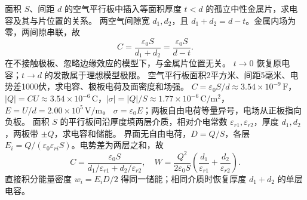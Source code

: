 \problemtext 面积 $S$、间距 $d$ 的空气平行板中插入等面积厚度 $t<d$ 的孤立中性金属片，求电容及其与片位置的关系。
\workings 两空气间隙宽 $d_1,d_2$，且 $d_1+d_2=d-t$。金属内场为零，两间隙串联，故
\[
C=\frac{\varepsilon_0 S}{d_1+d_2}=\frac{\varepsilon_0 S}{d-t}.
\]
在不接触极板、忽略边缘效应的模型下，与金属片位置无关。
\crosscheck $t\to0$ 恢复原电容；$t\to d$ 的发散属于理想模型极限。
\problemtext 空气平行板面积2平方米、间距5毫米、电势差1000伏，求电容、极板电荷及面密度和场强。
\workings $C=\varepsilon_0 S/d\approx3.54\times10^{-9}\,\mathrm F$，$|Q|=CU\approx3.54\times10^{-6}\,\mathrm C$，$|\sigma|=|Q|/S\approx1.77\times10^{-6}\,\mathrm{C/m^2}$，$E=U/d=2.00\times10^5\,\mathrm{V/m}$。
\crosscheck $\sigma=\varepsilon_0 E$；两板自由电荷等量异号，电场从正板指向负板。
\problemtext 面积 $S$ 的平行板间沿厚度填两层介质，相对介电常数 $\varepsilon_{r1},\varepsilon_{r2}$，厚度 $d_1,d_2$，两板带 $\pm Q$，求电容和储能。
\workings 界面无自由电荷，$D=Q/S$，各层 $E_i=Q/(\varepsilon_0\varepsilon_{ri}S)$。电势差为两层之和，故
\[
C=\frac{\varepsilon_0 S}{d_1/\varepsilon_{r1}+d_2/\varepsilon_{r2}},\quad
W=\frac{Q^2}{2\varepsilon_0 S}\left(\frac{d_1}{\varepsilon_{r1}}+\frac{d_2}{\varepsilon_{r2}}\right).
\]
\crosscheck 直接积分能量密度 $w_i=E_iD/2$ 得同一储能；相同介质时恢复厚度 $d_1+d_2$ 的单层电容。
